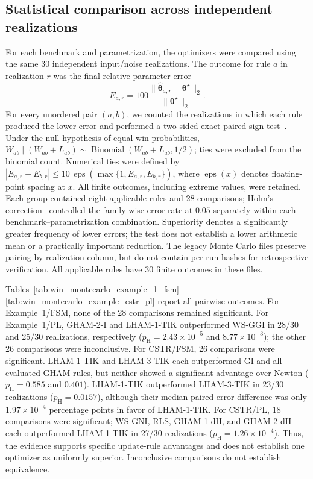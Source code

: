 \subsection{Statistical comparison across independent realizations}
\label{subsec:montecarlo_win_tests}
For each benchmark and parametrization, the optimizers were compared using
the same 30 independent input/noise realizations. The outcome for rule $a$
in realization $r$ was the final relative parameter error
\begin{equation}
 E_{a,r}=100\frac{\|\hat{\boldsymbol\theta}_{a,r}-\boldsymbol\theta^\star\|_2}
 {\|\boldsymbol\theta^\star\|_2}.
\end{equation}
For every unordered pair $(a,b)$, we counted the realizations in which each
rule produced the lower error and performed a two-sided exact paired sign
test~\cite{DixonMood1946}. Under the null hypothesis of equal win probabilities,
$W_{ab}\mid(W_{ab}+L_{ab})\sim\operatorname{Binomial}(W_{ab}+L_{ab},1/2)$;
ties were excluded from the binomial count. Numerical ties were defined by
$|E_{a,r}-E_{b,r}|\leq10\,\operatorname{eps}(\max\{1,E_{a,r},E_{b,r}\})$,
where $\operatorname{eps}(x)$ denotes floating-point spacing at $x$.
All finite outcomes, including extreme values, were retained. Each group
contained eight applicable rules and 28 comparisons; Holm's
correction~\cite{Holm1979} controlled the family-wise error rate at $0.05$
separately within each benchmark--parametrization combination.
Superiority denotes a significantly greater frequency of lower errors;
the test does not establish a lower arithmetic mean or a practically
important reduction. The legacy Monte Carlo files preserve pairing by
realization column, but do not contain per-run hashes for retrospective
verification. All applicable rules have 30 finite outcomes in these files.

Tables~\ref{tab:win_montecarlo_example_1_fsm}--\ref{tab:win_montecarlo_example_cstr_pl}
report all pairwise outcomes. For Example~1/FSM, none of the 28 comparisons
remained significant. For Example~1/PL, GHAM-2-I and LHAM-1-TIK outperformed
WS-GGI in 28/30 and 25/30 realizations, respectively
($p_{\mathrm H}=2.43\times10^{-5}$ and $8.77\times10^{-3}$); the other
26 comparisons were inconclusive. For CSTR/FSM, 26 comparisons were
significant. LHAM-1-TIK and LHAM-3-TIK each outperformed GI and all evaluated
GHAM rules, but neither showed a significant advantage over Newton
($p_{\mathrm H}=0.585$ and $0.401$). LHAM-1-TIK outperformed LHAM-3-TIK
in 23/30 realizations ($p_{\mathrm H}=0.0157$), although their median paired
error difference was only $1.97\times10^{-4}$ percentage points in favor
of LHAM-1-TIK. For CSTR/PL, 18 comparisons were significant; WS-GNI,
RLS, GHAM-1-dH, and GHAM-2-dH each outperformed LHAM-1-TIK in 27/30
realizations ($p_{\mathrm H}=1.26\times10^{-4}$).
Thus, the evidence supports specific update-rule advantages and does not
establish one optimizer as uniformly superior. Inconclusive comparisons
do not establish equivalence.

